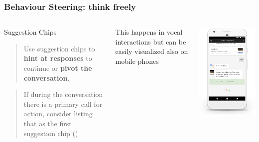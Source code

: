 \documentclass{beamer}
\begin{document}
\begin{frame}[allowframebreaks]
\frametitle{Behaviour Steering: think freely}

	\begin{columns}
			\begin{block}{Suggestion Chips}
		 		\begin{quote}
		 			Use suggestion chips to \textbf{hint at responses} to continue or \textbf{pivot the conversation}.
		 		\end{quote}
		 			
		 		\begin{quote}
		 			If during the conversation there is a primary call for action, consider listing that as the first suggestion chip (\cite{googleactions})
		 		\end{quote}
	 		\end{block}
 		\bigskip
 		
 		This happens in vocal interactions but can be easily visualized also on mobile phones
	 		
			\centering
			\includegraphics[width=1.0\linewidth]{images/suggestion-chip}
	\end{columns}
\framebreak


\end{frame}
\end{document}
